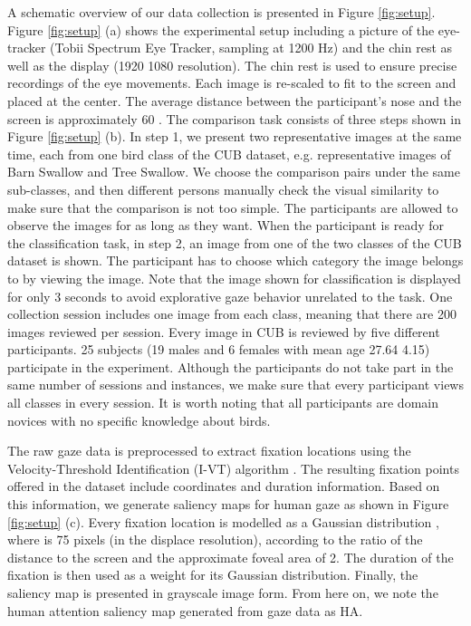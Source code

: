\documentclass{bmvc2k}
\begin{document}
A schematic overview of our data collection is presented in Figure \ref{fig:setup}. Figure \ref{fig:setup} (a) shows the experimental setup including a picture of the eye-tracker (Tobii Spectrum Eye Tracker, sampling at 1200 Hz) and the chin rest as well as the display (1920  1080 resolution). The chin rest is used to ensure precise recordings of the eye movements. Each image is re-scaled to fit to the screen and placed at the center. The average distance between the participant's nose and the screen is approximately 60 . The comparison task consists of three steps shown in Figure \ref{fig:setup} (b). In step 1, we present two representative images at the same time, each from one bird class of the CUB dataset, e.g. representative images of Barn Swallow and Tree Swallow. We choose the comparison pairs under the same sub-classes, and then different persons manually check the visual similarity to make sure that the comparison is not too simple. The participants are allowed to observe the images for as long as they want. 
When the participant is ready for the classification task, in step 2, an image from one of the two classes of the CUB dataset is shown. The participant has to choose which category the image belongs to by viewing the image. Note that the image shown for classification is displayed for only 3 seconds to avoid explorative gaze behavior unrelated to the task. One collection session includes one image from each class, meaning that there are 200 images reviewed per session. 
Every image in CUB is reviewed by five different participants. 25 subjects (19 males and 6 females with mean age 27.64  4.15) participate in the experiment. Although the participants do not take part in the same number of sessions and instances, we make sure that every participant views all classes in every session. It is worth noting that all participants are domain novices with no specific knowledge about birds.



 The raw gaze data is preprocessed to extract fixation locations using the Velocity-Threshold Identification (I-VT) algorithm \cite{olsen2012tobii}. The resulting fixation points offered in the dataset include coordinates and duration information. Based on this information, we generate saliency maps for human gaze as shown in Figure \ref{fig:setup} (c). Every fixation location is modelled as a Gaussian distribution , where  is 75 pixels (in the displace resolution), according to the ratio of the distance to the screen and the approximate foveal area of 2. The duration of the fixation is then used as a weight for its Gaussian distribution. Finally, the saliency map is presented in grayscale image form. From here on, we note the human attention saliency map generated from gaze data as HA.
\end{document}
